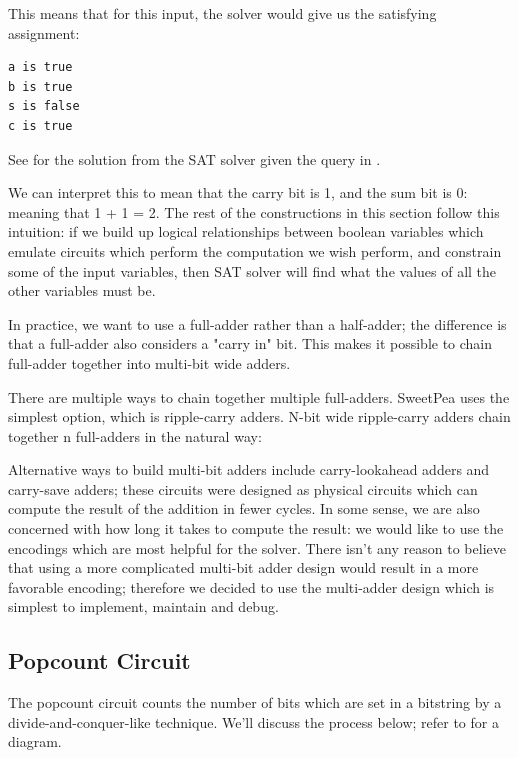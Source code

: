 This means that for this input, the solver would give us the satisfying assignment:
\begin{verbatim}
a is true
b is true
s is false
c is true
\end{verbatim}

See  for the solution from the SAT solver given the query in .

We can interpret this to mean that the carry bit is 1, and the sum bit is 0: meaning that 1 + 1 = 2. The rest of the constructions in this section follow this intuition: if we build up logical relationships between boolean variables which emulate circuits which perform the computation we wish perform, and constrain some of the input variables, then SAT solver will find what the values of all the other variables must be.

In practice, we want to use a full-adder rather than a half-adder; the difference is that a full-adder also considers a "carry in" bit. This makes it possible to chain full-adder together into multi-bit wide adders.

There are multiple ways to chain together multiple full-adders. SweetPea uses the simplest option, which is ripple-carry adders. N-bit wide ripple-carry adders chain together n full-adders in the natural way:

Alternative ways to build multi-bit adders include carry-lookahead adders and carry-save adders; these circuits were designed as physical circuits which can compute the result of the addition in fewer cycles. In some sense, we are also concerned with how long it takes to compute the result: we would like to use the encodings which are most helpful for the solver. There isn't any reason to believe that using a more complicated multi-bit adder design would result in a more favorable encoding; therefore we decided to use the multi-adder design which is simplest to implement, maintain and debug.

\subsection{Popcount Circuit}

The popcount circuit counts the number of bits which are set in a bitstring by a divide-and-conquer-like technique. We'll discuss the process below; refer to  for a diagram.

